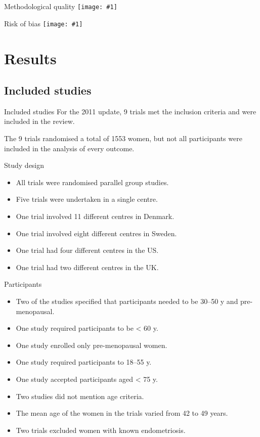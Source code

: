 \documentclass{beamer}
\newcommand*{\solo}[1]{\centering\texttt{[image: \#1]}}
\begin{document}
\begin{frame}{Methodological quality}
    \solo{F1.png}
\end{frame}

\begin{frame}{Risk of bias}
    \solo{F2.png}
\end{frame}

\section{Results}
\subsection{Included studies}
\begin{frame}{Included studies}
    For the 2011 update, 9 trials met the inclusion criteria and were included
    in the review.
    
    The 9 trials randomised a total of 1553 women, but not all participants
    were included in the analysis of every outcome.
\end{frame}

\begin{frame}{Study design}
    \begin{itemize}
        \item All trials were randomised parallel group studies.
        \item Five trials were undertaken in a single centre.
        \item One trial involved 11 different centres in Denmark.
        \item One trial involved eight different centres in Sweden.
        \item One trial had four different centres in the US.
        \item One trial had two different centres in the UK.
    \end{itemize}
\end{frame}

\begin{frame}{Participants}
    \begin{itemize}
        \item Two of the studies specified that participants needed to be 30--50 y and pre-menopausal.
        \item One study required participants to be < 60 y.
        \item One study enrolled only pre-menopausal women.
        \item One study required participants to 18--55 y.
        \item One study accepted participants aged < 75 y.
        \item Two studies did not mention age criteria.
        \item The mean age of the women in the trials varied from 42 to 49 years.
        \item Two trials excluded women with known endometriosis.
    \end{itemize}
\end{frame}
\end{document}
